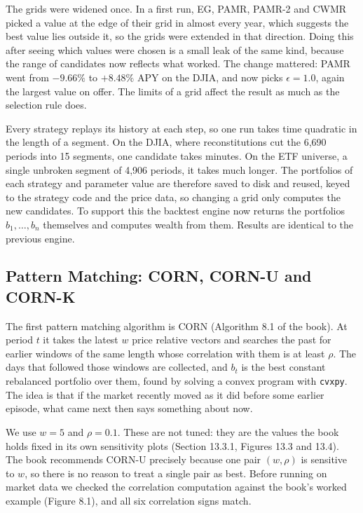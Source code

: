 \documentclass[11pt]{article}
\begin{document}
The grids were widened once. In a first run, EG, PAMR, PAMR-2 and CWMR
picked a value at the edge of their grid in almost every year, which
suggests the best value lies outside it, so the grids were extended in
that direction. Doing this after seeing which values were chosen is a
small leak of the same kind, because the range of candidates now reflects
what worked. The change mattered: PAMR went from $-9.66\%$ to $+8.48\%$
APY on the DJIA, and now picks $\epsilon=1.0$, again the largest value on
offer. The limits of a grid affect the result as much as the selection
rule does.

Every strategy replays its history at each step, so one run takes time
quadratic in the length of a segment. On the DJIA, where reconstitutions
cut the 6,690 periods into 15 segments, one candidate takes minutes. On
the ETF universe, a single unbroken segment of 4,906 periods, it takes
much longer. The portfolios of each strategy and parameter value are
therefore saved to disk and reused, keyed to the strategy code and the
price data, so changing a grid only computes the new candidates. To
support this the backtest engine now returns the portfolios
$b_1, \dots, b_n$ themselves and computes wealth from them. Results are
identical to the previous engine.

\subsection{Pattern Matching: CORN, CORN-U and CORN-K}
\label{sec:corn}

The first pattern matching algorithm is CORN (Algorithm 8.1 of the book).
At period $t$ it takes the latest $w$ price relative vectors and searches
the past for earlier windows of the same length whose correlation with
them is at least $\rho$. The days that followed those windows are
collected, and $b_t$ is the best constant rebalanced portfolio over them,
found by solving a convex program with \texttt{cvxpy}. The idea is that if
the market recently moved as it did before some earlier episode, what came
next then says something about now.

We use $w=5$ and $\rho=0.1$. These are not tuned: they are the values the
book holds fixed in its own sensitivity plots (Section 13.3.1, Figures
13.3 and 13.4). The book recommends CORN-U precisely because one pair
$(w,\rho)$ is sensitive to $w$, so there is no reason to treat a single
pair as best. Before running on market data we checked the correlation
computation against the book's worked example (Figure 8.1), and all six
correlation signs match.
\end{document}
